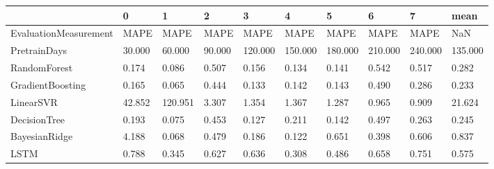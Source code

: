 \begin{tabular}{llllllllll}
\toprule
{} &      0 &       1 &      2 &       3 &       4 &       5 &       6 &       7 &    mean \\
\midrule
EvaluationMeasurement &   MAPE &    MAPE &   MAPE &    MAPE &    MAPE &    MAPE &    MAPE &    MAPE &     NaN \\
PretrainDays          & 30.000 &  60.000 & 90.000 & 120.000 & 150.000 & 180.000 & 210.000 & 240.000 & 135.000 \\
RandomForest          &  0.174 &   0.086 &  0.507 &   0.156 &   0.134 &   0.141 &   0.542 &   0.517 &   0.282 \\
GradientBoosting      &  0.165 &   0.065 &  0.444 &   0.133 &   0.142 &   0.143 &   0.490 &   0.286 &   0.233 \\
LinearSVR             & 42.852 & 120.951 &  3.307 &   1.354 &   1.367 &   1.287 &   0.965 &   0.909 &  21.624 \\
DecisionTree          &  0.193 &   0.075 &  0.453 &   0.127 &   0.211 &   0.142 &   0.497 &   0.263 &   0.245 \\
BayesianRidge         &  4.188 &   0.068 &  0.479 &   0.186 &   0.122 &   0.651 &   0.398 &   0.606 &   0.837 \\
LSTM                  &  0.788 &   0.345 &  0.627 &   0.636 &   0.308 &   0.486 &   0.658 &   0.751 &   0.575 \\
\bottomrule
\end{tabular}
